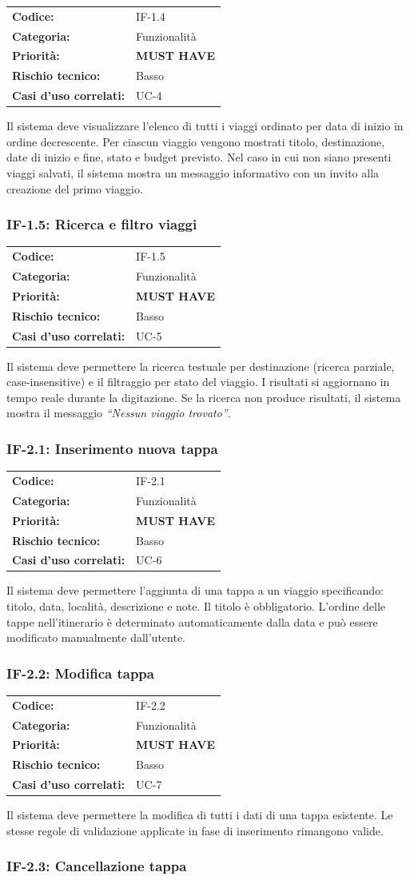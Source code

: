 \documentclass[12pt, a4paper]{article}
\makeatletter
\newcommand{\reqblock}[5]{%
  \begin{tabular}{@{}ll@{}}
    \toprule
    \textbf{Codice:}              & #1 \\
    \textbf{Categoria:}           & #2 \\
    \textbf{Priorità:}            & #3 \\
    \textbf{Rischio tecnico:}     & #4 \\
    \textbf{Casi d'uso correlati:}& #5 \\
    \bottomrule
  \end{tabular}
}
\newcommand{\MUST}{\colorbox{musthave}{\small\textbf{MUST HAVE}}}
\newcommand{\RISKL}{\colorbox{risklow}{\small Basso}}
\makeatother
\begin{document}
\medskip
\reqblock{IF-1.4}{Funzionalità}{\MUST}{\RISKL}{UC-4}
\medskip

\noindent
Il sistema deve visualizzare l'elenco di tutti i viaggi ordinato per data di inizio in
ordine decrescente. Per ciascun viaggio vengono mostrati titolo, destinazione, date di
inizio e fine, stato e budget previsto. Nel caso in cui non siano presenti viaggi salvati,
il sistema mostra un messaggio informativo con un invito alla creazione del primo viaggio.

\subsubsection{IF-1.5: Ricerca e filtro viaggi}

\medskip
\reqblock{IF-1.5}{Funzionalità}{\MUST}{\RISKL}{UC-5}
\medskip

\noindent
Il sistema deve permettere la ricerca testuale per destinazione (ricerca parziale,
case-insensitive) e il filtraggio per stato del viaggio. I risultati si aggiornano
in tempo reale durante la digitazione. Se la ricerca non produce risultati, il sistema
mostra il messaggio \textit{``Nessun viaggio trovato''}.

\subsubsection{IF-2.1: Inserimento nuova tappa}

\medskip
\reqblock{IF-2.1}{Funzionalità}{\MUST}{\RISKL}{UC-6}
\medskip

\noindent
Il sistema deve permettere l'aggiunta di una tappa a un viaggio specificando: titolo,
data, località, descrizione e note. Il titolo è obbligatorio. L'ordine delle tappe
nell'itinerario è determinato automaticamente dalla data e può essere modificato
manualmente dall'utente.

\subsubsection{IF-2.2: Modifica tappa}

\medskip
\reqblock{IF-2.2}{Funzionalità}{\MUST}{\RISKL}{UC-7}
\medskip

\noindent
Il sistema deve permettere la modifica di tutti i dati di una tappa esistente.
Le stesse regole di validazione applicate in fase di inserimento rimangono valide.

\subsubsection{IF-2.3: Cancellazione tappa}
\end{document}
